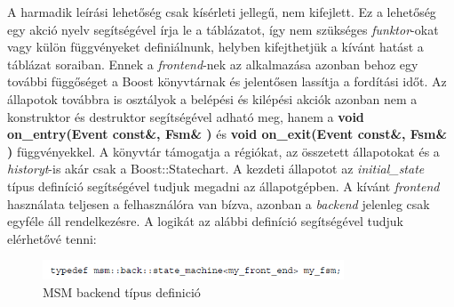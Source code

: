 \documentclass[a4paper,12pt]{report}
\begin{document}
A harmadik leírási lehetőség csak kísérleti jellegű, nem kifejlett. Ez a lehetőség egy akció nyelv segítségével írja le a táblázatot, így nem szükséges {\it funktor}-okat vagy külön függvényeket definiálnunk, helyben kifejthetjük a kívánt hatást a táblázat soraiban.
Ennek a {\it frontend}-nek az alkalmazása azonban behoz egy további függőséget a Boost könyvtárnak és jelentősen lassítja a fordítási időt. Az állapotok továbbra is osztályok a belépési és kilépési akciók azonban nem a konstruktor és destruktor segítségével adható meg, hanem a {\bf void on\_entry(Event const\&, Fsm\& )} és {\bf void on\_exit(Event const\&, Fsm\& )} függvényekkel. A könyvtár támogatja a régiókat, az összetett állapotokat és a {\it historyt}-is akár csak a Boost::Statechart. A kezdeti állapotot az {\it initial\_state} típus definíció segítségével tudjuk megadni az állapotgépben. A kívánt {\it frontend} használata teljesen a felhasználóra van bízva, azonban a {\it backend} jelenleg csak egyféle áll rendelkezésre. A logikát az alábbi definíció segítségével tudjuk elérhetővé tenni:

\begin{figure}[hbtp]
\centering
\includegraphics[width=0.8\textwidth]{msmback.png}
\caption{MSM backend típus definició}
\label{fig:msbact}
\end{figure}
\end{document}
